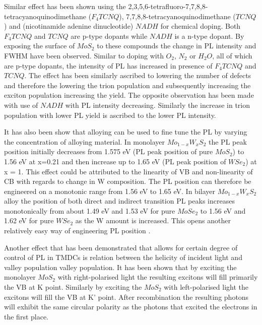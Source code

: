 Similar effect has been shown using the 2,3,5,6-tetrafluoro-7,7,8,8-tetracyanoquinodimethane ($F_4TCNQ$), 7,7,8,8-tetracyanoquinodimethane ($TCNQ$) and (nicotinamide adenine dinucleotide) $NADH$ for chemical doping. Both $F_4TCNQ$ and $TCNQ$ are p-type dopants while $NADH$ is a n-type dopant. By exposing the surface of $MoS_2$ to these compounds the change in PL intensity and FWHM have been observed. Similar to doping with $O_2$, $N_2$ or $H_2O$, all of which are p-type dopants, the intensity of PL has increased in presence of $F_4TCNQ$ and $TCNQ$. The effect has been similarly ascribed to lowering the number of defects and therefore the lowering the trion population and subsequently increasing the exciton population increasing the yield. The opposite observation has been made with use of $NADH$ with PL intensity decreasing. Similarly the increase in trion population with lower PL yield is ascribed to the lower PL intensity. \cite{Mouri2013}
	
It has also been show that alloying can be used to fine tune the PL by varying the concentration of alloying material. In monolayer $Mo_{1-x}W_xS_2$ the PL peak position initially decreases from 1.575 eV (PL peak position of pure $MoS_2$) to 1.56 eV at x=0.21 and then increase up to 1.65 eV (PL peak position of $WSe_2$) at x = 1. This effect could be attributed to the linearity of VB and non-linearity of CB with regards to change in W composition. The PL position can therefore be engineered on a monotonic range from 1.56 eV to 1.65 eV. In bilayer $Mo_{1-x}W_xS_2$ alloy the position of both direct and indirect transition PL peaks increases monotonically from about 1.49 eV and 1.53 eV for pure $MoSe_2$ to 1.56 eV and 1.62 eV for pure $WSe_2$ as the W amount is increased. This opens another relatively easy way of engineering PL position \cite{Zhang2014}.
	
Another effect that has been demonstrated that allows for certain degree of control of PL in TMDCs is relation between the helicity of incident light and valley population valley population. It has been shown that by exciting the monolayer $MoS_2$ with right-polarised light the resulting excitons will fill primarily the VB at K point. Similarly by exciting the $MoS_2$ with left-polarised light the excitons will fill the VB at K' point. After recombination the resulting photons will exhibit the same circular polarity as the photons that excited the electrons in the first place. \cite{Mak2012}\cite{Mak2012a}
	
